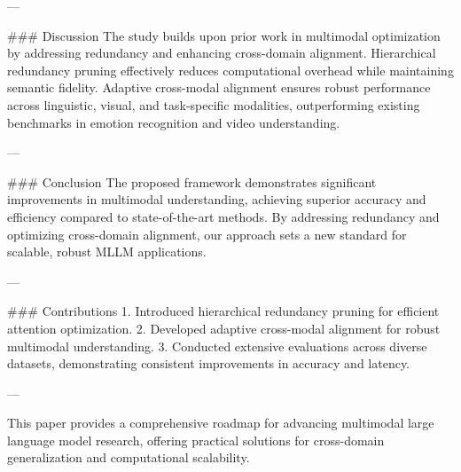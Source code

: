 ---

### Discussion
The study builds upon prior work in multimodal optimization by addressing redundancy and enhancing cross-domain alignment. Hierarchical redundancy pruning effectively reduces computational overhead while maintaining semantic fidelity. Adaptive cross-modal alignment ensures robust performance across linguistic, visual, and task-specific modalities, outperforming existing benchmarks in emotion recognition and video understanding.

---

### Conclusion
The proposed framework demonstrates significant improvements in multimodal understanding, achieving superior accuracy and efficiency compared to state-of-the-art methods. By addressing redundancy and optimizing cross-domain alignment, our approach sets a new standard for scalable, robust MLLM applications.

---

### Contributions
1. Introduced hierarchical redundancy pruning for efficient attention optimization.
2. Developed adaptive cross-modal alignment for robust multimodal understanding.
3. Conducted extensive evaluations across diverse datasets, demonstrating consistent improvements in accuracy and latency.

---

This paper provides a comprehensive roadmap for advancing multimodal large language model research, offering practical solutions for cross-domain generalization and computational scalability.